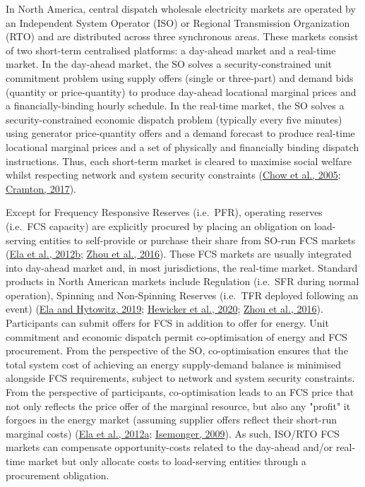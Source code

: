 \documentclass[12pt,a4paper,]{report}
\begin{document}
In North America, central dispatch wholesale electricity markets are
operated by an Independent System Operator (ISO) or Regional
Transmission Organization (RTO) and are distributed across three
synchronous areas. These markets consist of two short-term centralised
platforms: a day-ahead market and a real-time market. In the day-ahead
market, the SO solves a security-constrained unit commitment problem
using supply offers (single or three-part) and demand bids (quantity or
price-quantity) to produce day-ahead locational marginal prices and a
financially-binding hourly schedule. In the real-time market, the SO
solves a security-constrained economic dispatch problem (typically every
five minutes) using generator price-quantity offers and a demand
forecast to produce real-time locational marginal prices and a set of
physically and financially binding dispatch instructions. Thus, each
short-term market is cleared to maximise social welfare whilst
respecting network and system security constraints
(\protect\hyperlink{ref-chowElectricityMarketDesign2005}{Chow et al.,
2005};
\protect\hyperlink{ref-cramtonElectricityMarketDesign2017}{Cramton,
2017}).

Except for Frequency Responsive Reserves (i.e.~PFR), operating reserves
(i.e.~FCS capacity) are explicitly procured by placing an obligation on
load-serving entities to self-provide or purchase their share from
SO-run FCS markets
(\protect\hyperlink{ref-elaAlternativeApproachesIncentivizing2012}{Ela
et al., 2012b};
\protect\hyperlink{ref-zhouSurveyAncillaryServices2016}{Zhou et al.,
2016}). These FCS markets are usually integrated into day-ahead market
and, in most jurisdictions, the real-time market. Standard products in
North American markets include Regulation (i.e.~SFR during normal
operation), Spinning and Non-Spinning Reserves (i.e.~TFR deployed
following an event)
(\protect\hyperlink{ref-elaAncillaryServicesUnited2019}{Ela and
Hytowitz, 2019};
\protect\hyperlink{ref-hewickerDimensioningControlReserves2020}{Hewicker
et al., 2020};
\protect\hyperlink{ref-zhouSurveyAncillaryServices2016}{Zhou et al.,
2016}). Participants can submit offers for FCS in addition to offer for
energy. Unit commitment and economic dispatch permit co-optimisation of
energy and FCS procurement. From the perspective of the SO,
co-optimisation ensures that the total system cost of achieving an
energy supply-demand balance is minimised alongside FCS requirements,
subject to network and system security constraints. From the perspective
of participants, co-optimisation leads to an FCS price that not only
reflects the price offer of the marginal resource, but also any "profit"
it forgoes in the energy market (assuming supplier offers reflect their
short-run marginal costs)
(\protect\hyperlink{ref-elaEffectiveAncillaryServices2012}{Ela et al.,
2012a};
\protect\hyperlink{ref-isemongerEvolvingDesignRTO2009}{Isemonger,
2009}). As such, ISO/RTO FCS markets can compensate opportunity-costs
related to the day-ahead and/or real-time market but only allocate costs
to load-serving entities through a procurement obligation.
\end{document}
